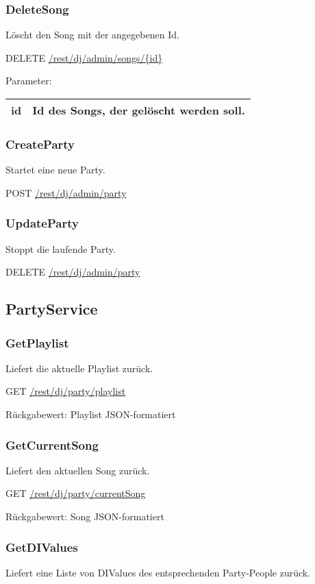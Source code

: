 \subsubsection{DeleteSong}
\label{service:DeleteSong}
Löscht den Song mit der angegebenen Id.

DELETE
\url{/rest/dj/admin/songs/{id}}

Parameter:\\
\begin{tabularx}{\textwidth}{|l|X|}
\hline id & Id des Songs, der gelöscht werden soll. \\ 
\hline 
\end{tabularx}

\subsubsection{CreateParty}
\label{service:CreateParty}
Startet eine neue Party.

POST
\url{/rest/dj/admin/party}

\subsubsection{UpdateParty}
\label{service:UpdateParty}
Stoppt die laufende Party.

DELETE
\url{/rest/dj/admin/party}

\subsection{PartyService}

\subsubsection{GetPlaylist}
\label{service:GetPlaylist}
Liefert die aktuelle Playlist zurück.

GET
\url{/rest/dj/party/playlist}

Rückgabewert: Playlist JSON-formatiert

\subsubsection{GetCurrentSong}
\label{service:GetCurrentSong}
Liefert den aktuellen Song zurück.

GET
\url{/rest/dj/party/currentSong}

Rückgabewert: Song JSON-formatiert

\subsubsection{GetDIValues}
\label{service:GetDIValues}
Liefert eine Liste von DIValues des entsprechenden Party-People zurück.

